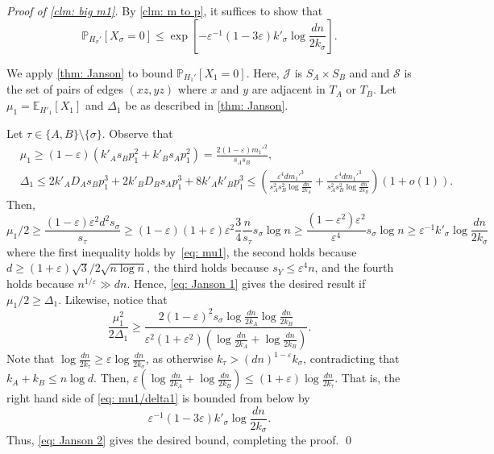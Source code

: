 \documentclass[11pt]{article}
\newcommand{\eps}{\varepsilon}
\def\P{\mathbb P}
\theoremstyle{plain}
\begin{document}
\noindent\textit{Proof of \cref{clm: big m1}. } 
By \cref{clm: m to p}, it suffices to show that
    \[
    \P_{H_\sigma'}[X_\sigma = 0] \leq \exp\left[-\eps^{-1}(1 - 3\eps)k'_\sigma\log\frac{dn}{2k_\sigma}\right].
    \]


We apply \cref{thm: Janson} to bound $\P_{H_1'}[X_1 = 0]$. Here, $\mathcal J$ is $S_A \times S_B$ and and $\mathcal S$ is the set of pairs of edges $(xz,yz)$ where $x$ and $y$ are adjacent in $T_A$ or $T_B$. Let $\mu_1 = \mathbb E_{H'_1}[X_1]$ and $\Delta_1$ be as described in \cref{thm: Janson}. 

Let $\tau\in\{A,B\}\setminus \{\sigma\}$. Observe that 
    \begin{align}
        & \mu_1 \geq (1 - \eps)(k'_As_Bp^2_1 + k'_Bs_Ap_1^2) = \frac{2(1 - \eps)m_1'^2}{s_As_B},\label{eq: mu1}\\
        &\Delta_1 \leq 2k'_AD_As_Bp_1^3 + 2k'_BD_Bs_Ap_1^3 + 8k'_Ak'_Bp_1^3 \leq \left(\frac{\eps^4dm_1'^3}{s_A^2s_B^2\log\frac{dn}{2k_A}} + \frac{\eps^4dm_1'^3}{s_A^2s_B^2\log\frac{dn}{2k_B}}\right)(1 + o(1))\label{eq: Delta1}.
    \end{align}
    Then,
    \[
    \mu_1/2 \geq \frac{(1 - \eps)\eps^2d^2s_\sigma}{s_\tau}\geq (1 - \eps)(1 + \eps)\eps^2\frac{3}{4}\frac{n}{s_\tau}s_\sigma\log n\geq \frac{(1 - \eps^2)\eps^2}{\eps^4}s_\sigma\log n \geq \eps^{-1}k'_\sigma\log\frac{dn}{2k_\sigma}
    \]
    where the first inequality holds by~\eqref{eq: mu1}, the second holds because $d \geq (1 + \eps)\sqrt 3/2\sqrt{n\log n}$, the third holds because $s_Y \leq \eps^4 n$, and the fourth holds because $n^{1/\eps} \gg dn$. Hence, \eqref{eq: Janson 1} gives the desired result if $\mu_1/2 \geq \Delta_1$. 
    Likewise, notice that 
    \begin{equation}\label{eq: mu1/delta1}
            \frac{\mu_1^2}{2\Delta_1} \geq \frac{2(1 - \eps)^2s_\sigma\log\frac{dn}{2k_A}\log\frac{dn}{2k_B}}{\eps^2(1 + \eps^2)\left(\log\frac{dn}{2k_A} + \log\frac{dn}{2k_B}\right)}.
    \end{equation}
    Note that $\log\frac{dn}{2k_\tau} \geq \eps\log\frac{dn}{2k_\sigma}$, as otherwise $k_\tau > (dn)^{1 - \eps}k_\sigma$, contradicting that $k_A + k_B \leq n\log d$. Then, $\eps\left(\log\frac{dn}{2k_A} + \log\frac{dn}{2k_B}\right) \leq(1  + \eps)\log\frac{dn}{2k_\tau}$. That is, the right hand side of \eqref{eq: mu1/delta1} is bounded from below by 
    \[
    \eps^{-1}(1 - 3\eps)k'_\sigma\log\frac{dn}{2k_\sigma}.
    \]
    Thus, \eqref{eq: Janson 2} gives the desired bound, completing the proof.
\qed
\end{document}
